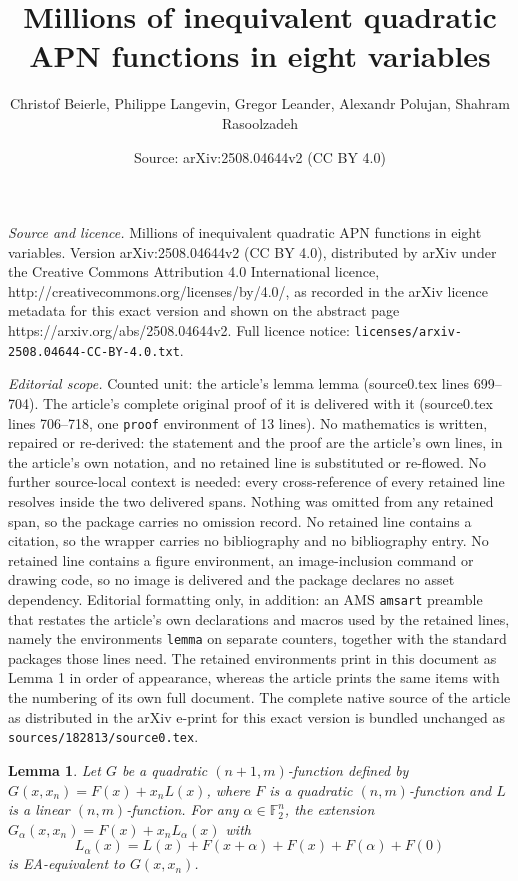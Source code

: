 \documentclass[10pt,a4paper]{amsart}
\title{Millions of inequivalent quadratic APN functions in eight variables}
\author{Christof Beierle, Philippe Langevin, Gregor Leander, Alexandr Polujan, Shahram Rasoolzadeh}
\date{Source: arXiv:2508.04644v2 (CC BY 4.0)}
\newtheorem{lemma}{Lemma}
\def\F{\mathbb F}
\begin{document}
\maketitle

\noindent\emph{Source and licence.} Millions of inequivalent quadratic APN functions in eight variables. Version arXiv:2508.04644v2 (CC BY 4.0), distributed by arXiv under the Creative Commons Attribution 4.0 International licence, http://creativecommons.org/licenses/by/4.0/, as recorded in the arXiv licence metadata for this exact version and shown on the abstract page https://arxiv.org/abs/2508.04644v2. Full licence notice: \texttt{licenses/arxiv-2508.04644-CC-BY-4.0.txt}.\par\smallskip

\noindent\textit{Editorial scope.} Counted unit: the article's lemma lemma (source0.tex lines 699--704). The article's complete original proof of it is delivered with it (source0.tex lines 706--718, one \texttt{proof} environment of 13 lines). No mathematics is written, repaired or re-derived: the statement and the proof are the article's own lines, in the article's own notation, and no retained line is substituted or re-flowed.  No further source-local context is needed: every cross-reference of every retained line resolves inside the two delivered spans.  Nothing was omitted from any retained span, so the package carries no omission record.  No retained line contains a citation, so the wrapper carries no bibliography and no bibliography entry.  No retained line contains a figure environment, an image-inclusion command or drawing code, so no image is delivered and the package declares no asset dependency.  Editorial formatting only, in addition: an AMS \texttt{amsart} preamble that restates the article's own declarations and macros used by the retained lines, namely the environments \texttt{lemma} on separate counters, together with the standard packages those lines need.  The retained environments print in this document as Lemma 1 in order of appearance, whereas the article prints the same items with the numbering of its own full document.  The complete native source of the article as distributed in the arXiv e-print for this exact version is bundled unchanged as \texttt{sources/182813/source0.tex}.
\begin{lemma}
	Let $G$ be a quadratic $(n+1,m)$-function defined by $G(x, x_n) = F(x) + x_n L(x)$, where $F$ is a quadratic $(n,m)$-function and $L$ is a linear $(n,m)$-function.
	For any $\alpha \in \F_2^n$, the extension $G_{\alpha}(x, x_n) = F(x) + x_n L_{\alpha}(x)$ with
	$$ L_{\alpha}(x) = L(x) + F(x+\alpha) + F(x) + F(\alpha) + F(0) $$
	is EA-equivalent to $G(x, x_n)$.
\end{lemma}
\end{document}
